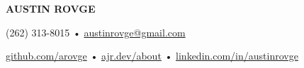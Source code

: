 \centering\textbf{\LARGE AUSTIN ROVGE}

\centering(262) 313-8015 • \href{mailto:austinrovge@gmail.com}{austinrovge@gmail.com}

\centering\href{https://github.com/arovge}{github.com/arovge} • \href{https://ajr.dev/about}{ajr.dev/about} • \href{https://linkedin.com/in/austinrovge}{linkedin.com/in/austinrovge}
